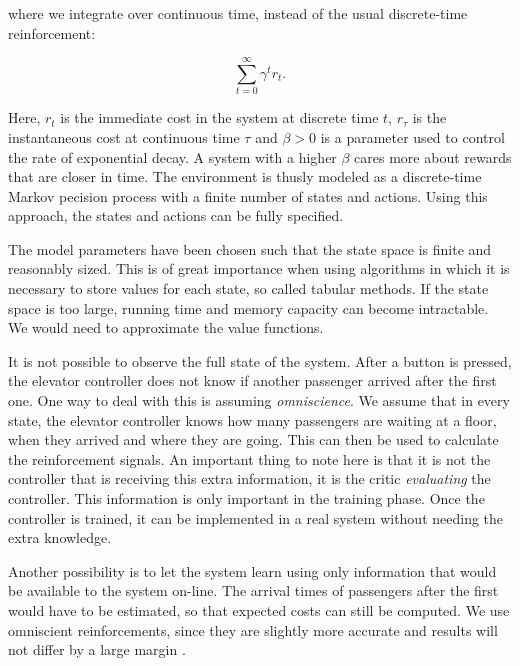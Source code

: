 where we integrate over continuous time, instead of the usual discrete-time reinforcement:

\begin{equation*}
    \sum_{t=0}^{\infty} \gamma^t r_t.
\end{equation*}

Here, $r_t$ is the immediate cost in the system at discrete time $t$, $r_\tau$ is the instantaneous cost at continuous time $\tau$ and $\beta > 0$ is a parameter used to control the rate of exponential decay. A system with a higher $\beta$ cares more about rewards that are closer in time. The environment is thusly modeled as a discrete-time Markov pecision process with a finite number of states and actions. Using this approach, the states and actions can be fully specified.

The model parameters have been chosen such that the state space is finite and reasonably sized. This is of great importance when using algorithms in which it is necessary to store values for each state, so called tabular methods. If the state space is too large, running time and memory capacity can become intractable. We would need to approximate the value functions. 


It is not possible to observe the full state of the system. After a button is pressed, the elevator controller does not know if another passenger arrived after the first one. One way to deal with this is assuming \textit{omniscience}. We assume that in every state, the elevator controller knows how many passengers are waiting at a floor, when they arrived and where they are going. This can then be used to calculate the reinforcement signals. An important thing to note here is that it is not the controller that is receiving this extra information, it is the critic \textit{evaluating} the controller. This information is only important in the training phase. Once the controller is trained, it can be implemented in a real system without needing the extra knowledge.

Another possibility is to let the system learn using only information that would be available to the system on-line. The arrival times of passengers after the first would have to be estimated, so that expected costs can still be computed. We use omniscient reinforcements, since they are slightly more accurate and results will not differ by a large margin \cite{crites_barto_group_1998}.

